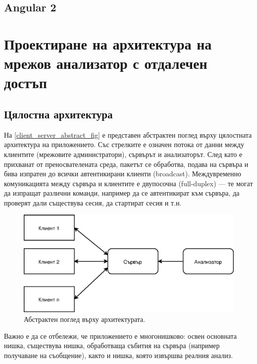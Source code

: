 \documentclass[12pt,a4paper,oneside]{book}
\begin{document}
\subsection{Angular 2}


\section{Проектиране на архитектура на мрежов анализатор с отдалечен достъп}

\subsection{Цялостна архитектура}

На \autoref{client_server_abstract_fig} е представен абстрактен поглед върху
цялостната архитектура на приложението. Със стрелките е означен потока от
данни между клиентите (мрежовите администратори), сървърът и анализаторът. След
като е прихванат от преносвателената среда, пакетът се обработва, подава на
сървъра и бива изпратен до всички автентикирани клиенти (broadcast).
Междувременно комуникацията между сървъра и клиентите е двупосочна (full-duplex)
--- те могат да изпращат различни команди, например да се автентикират към сървъра,
да проверят дали съществува сесия, да стартират сесия и т.н.

\begin{figure}[h!]
  \centering
  \includegraphics[scale=.7]{figures/client_server_abstract.eps}
  \caption{Абстрактен поглед върху архитектурата.}
  \label{client_server_abstract_fig}
\end{figure}

Важно е да се отбележи, че приложението е многонишково: освен основната нишка,
съществува нишка, обработваща събития на сървъра (например получаване на
съобщение), както и нишка, която извършва реалния анализ.
\end{document}
